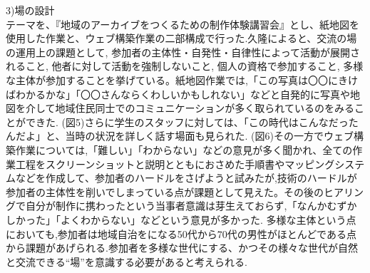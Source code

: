 \documentclass[a4paper]{jsarticle}
\begin{document}
\item 3)場の設計\\
テーマを、『地域のアーカイブをつくるための制作体験講習会』とし、紙地図を使用した作業と、ウェブ構築作業の二部構成で行った.久隆によると、交流の場の運用上の課題として, 参加者の主体性・自発性・自律性によって活動が展開されること, 他者に対して活動を強制しないこと, 個人の資格で参加すること, 多様な主体が参加することを挙げている。\cite{10}紙地図作業では,「この写真は〇〇にきけばわかるかな」「〇〇さんならくわしいかもしれない」などと自発的に写真や地図を介して地域住民同士でのコミュニケーションが多く取られているのをみることができた. (図5)さらに学生のスタッフに対しては、「この時代はこんなだったんだよ」と、当時の状況を詳しく話す場面も見られた. (図6)その一方でウェブ構築作業については,「難しい」「わからない」などの意見が多く聞かれ、全ての作業工程をスクリーンショットと説明とともにおさめた手順書やマッピングシステムなどを作成して、参加者のハードルをさげようと試みたが,技術のハードルが参加者の主体性を削いでしまっている点が課題として見えた。その後のヒアリングで自分が制作に携わったという当事者意識は芽生えておらず,「なんかむずかしかった」「よくわからない」などという意見が多かった.
多様な主体という点においても,参加者は地域自治をになる50代から70代の男性がほとんどである点から課題があげられる.参加者を多様な世代にする、かつその様々な世代が自然と交流できる“場”を意識する必要があると考えられる.\\\\\\\par
\end{document}
